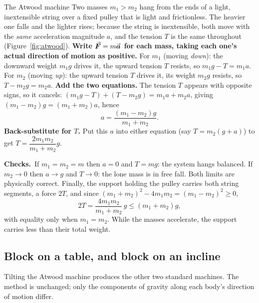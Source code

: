 \begin{figure}[htbp]
\centering
{}
\end{figure}

\begin{derivbox}{The Atwood machine}
Two masses $m_1>m_2$ hang from the ends of a light, inextensible string over a fixed pulley that is
light and frictionless. The heavier one falls and the
lighter rises; because the string is inextensible, both move with the \emph{same} acceleration magnitude
$a$, and the tension $T$ is the same throughout (Figure~\ref{fig:atwood}).
 \textbf{Write $\vec{\bm{F}}=m\vec{\bm{a}}$ for each mass, taking each one's actual direction of motion as
positive.} For $m_1$ (moving \emph{down}): the downward weight $m_1g$ drives it, the upward tension $T$
resists, so $m_1g-T=m_1a$. For $m_2$ (moving \emph{up}): the upward tension $T$ drives it, its weight
$m_2g$ resists, so $T-m_2g=m_2a$.
 \textbf{Add the two equations.} The tension $T$ appears with opposite signs, so it cancels:
$(m_1g-T)+(T-m_2g)=m_1a+m_2a$, giving $(m_1-m_2)g=(m_1+m_2)a$, hence
\[
a=\frac{(m_1-m_2)g}{m_1+m_2}.
\]
 \textbf{Back-substitute for $T$.} Put this $a$ into either equation (say $T=m_2(g+a)$) to get
$T=\dfrac{2m_1 m_2}{m_1+m_2}g$.
\par\medskip\noindent\textbf{Checks.}\ If $m_1=m_2=m$ then $a=0$ and $T=mg$: the system hangs
balanced. If $m_2\to0$ then $a\to g$ and $T\to0$: the lone mass is in free fall. Both limits are
physically correct. Finally, the support holding the pulley carries both string segments, a force $2T$,
and since $(m_1+m_2)^2-4m_1m_2=(m_1-m_2)^2\ge0$,
\[
2T=\frac{4m_1m_2}{m_1+m_2}\,g\le(m_1+m_2)g,
\]
with equality only when $m_1=m_2$. While the masses accelerate, the support carries less than their
total weight.
\end{derivbox}

\subsection{Block on a table, and block on an incline}

Tilting the Atwood machine produces the other two standard machines. The method is unchanged; only the
components of gravity along each body's direction of motion differ.

